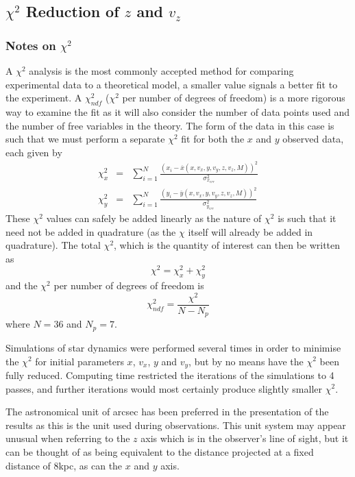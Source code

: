 \subsection{$\chi^2$ Reduction of $z$ and $v_z$}

\subsubsection{Notes on $\chi^2$}
A $\chi^2$ analysis is the most commonly accepted method for comparing experimental data to a theoretical model, a smaller value
signals a better fit to the experiment. A $\chi^2_{ndf}$ ($\chi^2$ per number of degrees of freedom) is a more rigorous way to examine the fit
as it will also consider the number of data points used and the number of free variables in the theory. The form of the data in this
case is such that we must perform a separate $\chi^2$ fit for both the $x$ and $y$ observed data, each given by
\begin{eqnarray}
	\chi^2_x &=& \sum_{i=1}^{N} \frac{\left(x_i-\overline{x}(x,v_x,y,v_y,z,v_z,M)\right)^2}{\sigma^2_{x_{err}}}
	\label{eqn_chisquarex} \\
	\chi^2_y &=& \sum_{i=1}^{N} \frac{\left(y_i-\overline{y}(x,v_x,y,v_y,z,v_z,M)\right)^2}{\sigma^2_{y_{err}}}
	\label{eqn_chisquarey}
\end{eqnarray}
These $\chi^2$ values can safely be added linearly as the nature of $\chi^2$ is such that it need not be added in quadrature (as the
$\chi$ itself will already be added in quadrature). The total $\chi^2$, which is the quantity of interest can then be written as
\begin{equation}
	\chi^2 = \chi^2_x + \chi^2_y
	\label{chisquare}
\end{equation}
and the $\chi^2$ per number of degrees of freedom is
\begin{equation}
	\chi^2_{ndf} = \frac{\chi^2}{N-N_p}
	\label{chisquarendf}
\end{equation}
where $N=36$ and $N_p=7$.

Simulations of star dynamics were performed several times in order to minimise the $\chi^2$ for initial parameters $x$, $v_x$, $y$
and $v_y$, but by no means have the $\chi^2$ been fully reduced. Computing time restricted the iterations of the simulations to 4
passes, and further iterations would most certainly produce slightly smaller $\chi^2$.

The astronomical unit of arcsec has been preferred in the presentation of the results as this is the unit used during observations.
This unit system may appear unusual when referring to the $z$ axis which is in the observer's line of sight, but it can be thought
of as being equivalent to the distance projected at a fixed distance of 8kpc, as can the $x$ and $y$ axis.

